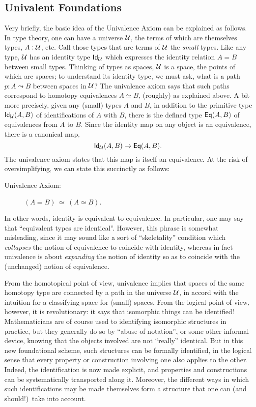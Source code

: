 {\subsection*{Univalent Foundations}

Very briefly, the basic idea of the Univalence Axiom can be explained as follows.
In type theory, one can have a universe $\mathcal{U}$, the terms of which are themselves types, $A : \mathcal{U}$, etc.
Call those types that are terms of $\mathcal{U}$ the \emph{small} types.
Like any type, $\mathcal{U}$ has an identity type ${{\sf Id}}_{\mathcal{U}}$ which expresses the identity relation $A = B$ between small types.
Thinking of types as spaces, $\mathcal{U}$ is a space, the points of which are spaces; to understand its identity type, we must ask, what is a path $p : A \leadsto B$ between spaces in $\mathcal{U}$?
The univalence axiom says that such paths correspond to homotopy equivalences $A\simeq B$, (roughly) as explained above.
A bit more precisely, given any (small) types $A$ and $B$, in addition to the primitive type ${{\sf Id}}_{\mathcal{U}}(A,B)$ of identifications of $A$ with $B$, there is the defined type ${{\sf Eq}}(A,B)$ of equivalences from $A$ to $B$.
Since the identity map on any object is an equivalence, there is a canonical map,
$${{\sf Id}}_{\mathcal{U}}(A,B)\to{{\sf Eq}}(A,B).$$
The univalence axiom states that this map is itself an equivalence.
At the risk of oversimplifying, we can state this succinctly as follows:

\begin{description}
\item[Univalence Axiom:]  $(A = B)\ \simeq\ (A\simeq B)$.
\end{description}
%
In other words, identity is equivalent to equivalence. 
In particular, one may say that ``equivalent types are identical''.
However, this phrase is somewhat misleading, since it may sound like a sort of ``skeletality'' condition which \emph{collapses} the notion of equivalence to coincide with identity, whereas in fact univalence is about \emph{expanding} the notion of identity so as to coincide with the (unchanged) notion of equivalence.

From the homotopical point of view, univalence implies that spaces of the same homotopy type are connected by a path in the universe $\mathcal{U}$, in accord with the intuition for a classifying space for (small) spaces.
From the logical point of view, however, it is revolutionary: it says that isomorphic things can be identified!  Mathematicians are of course used to identifying isomorphic structures in practice, but they generally do so by ``abuse of notation'', or some other informal device, knowing that the objects involved are not ``really'' identical.  But in this new foundational scheme, such structures can be formally identified, in the logical sense that every property or construction involving one also applies to the other. Indeed, the identification is now made explicit, and properties and constructions can be systematically transported along it.  Moreover, the different ways in which such identifications may be made themselves form a structure that one can (and should!)\ take into account.

}
